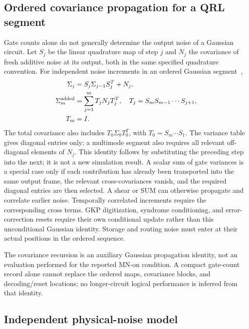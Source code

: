 \documentclass[aps,
prx,
superscriptaddress,
reprint,
longbibliography,
floatfix]{revtex4-2}
\begin{document}
\subsection{Ordered covariance propagation for a QRL segment}
Gate counts alone do not generally determine the output noise of a Gaussian circuit. Let $S_j$ be the linear quadrature map of step $j$ and $N_j$ the covariance of fresh additive noise at its output, both in the same specified quadrature convention. For independent noise increments in an ordered Gaussian segment~\cite{Weedbrook2012CVReview},
\begin{align}
\Sigma_j &= S_j\Sigma_{j-1}S_j^T+N_j,\\
\Sigma_{m}^{\rm added}&=\sum_{j=1}^{m}T_jN_jT_j^T,
\quad T_j=S_mS_{m-1}\cdots S_{j+1},\\
T_m&=I.
\label{eq:ordered_qrl_covariance}
\end{align}
The total covariance also includes $T_0\Sigma_0T_0^T$, with $T_0=S_m\cdots S_1$. The variance table gives diagonal entries only; a multimode segment also requires all relevant off-diagonal elements of $N_j$. This identity follows by substituting the preceding step into the next; it is not a new simulation result. A scalar sum of gate variances is a special case only if each contribution has already been transported into the same output frame, the relevant cross-covariances vanish, and the required diagonal entries are then selected. A shear or SUM can otherwise propagate and correlate earlier noise. Temporally correlated increments require the corresponding cross terms. GKP digitization, syndrome conditioning, and error-correction resets require their own conditional update rather than this unconditional Gaussian identity. Storage and routing noise must enter at their actual positions in the ordered sequence.

The covariance recursion is an auxiliary Gaussian propagation identity, not an evaluation performed for the reported MN-on condition. A compact gate-count record alone cannot replace the ordered maps, covariance blocks, and decoding/reset locations; no longer-circuit logical performance is inferred from that identity.

\subsection{Independent physical-noise model}
\end{document}
